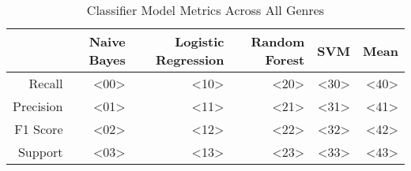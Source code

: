 \begin{table}[h]
    \centering
    \begin{tabular}{r|r|r|r|r|r}
         & Naive Bayes & Logistic Regression & Random Forest & SVM & Mean \\\hline
        Recall     & <00> & <10> & <20> & <30> & <40>\\
        Precision  & <01> & <11> & <21> & <31> & <41>\\
        F1 Score   & <02> & <12> & <22> & <32> & <42>\\
        Support    & <03> & <13> & <23> & <33> & <43>
\end{tabular}
    \caption{Classifier Model Metrics Across All Genres}
    \label{tab:model_metrics}
\end{table}